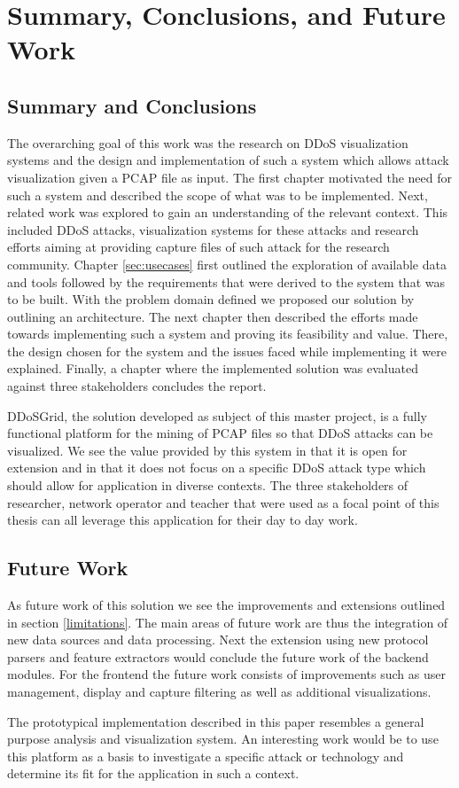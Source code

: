 \chapter{Summary, Conclusions, and Future Work} %
\section{Summary and Conclusions}
The overarching goal of this work was the research on DDoS visualization systems and the design and implementation of such a system which allows attack visualization given a PCAP file as input. The first chapter motivated the need for such a system and described the scope of what was to be implemented. Next, related work was explored to gain an understanding of the relevant context. This included DDoS attacks, visualization systems for these attacks and research efforts aiming at providing capture files of such attack for the research community.
Chapter \ref{sec:usecases} first outlined the exploration of available data and tools followed by the requirements that were derived to the system that was to be built. With the problem domain defined we proposed our solution by outlining an architecture.
The next chapter then described the efforts made towards implementing such a system and proving its feasibility and value. There, the design chosen for the system and the issues faced while implementing it were explained.
Finally, a chapter where the implemented solution was evaluated against three stakeholders concludes the report.

DDoSGrid, the solution developed as subject of this master project, is a fully functional platform for the mining of PCAP files so that DDoS attacks can be visualized. We see the value provided by this system in that it is open for extension and in that it does not focus on a specific DDoS attack type which should allow for application in diverse contexts. The three stakeholders of researcher, network operator and teacher that were used as a focal point of this thesis can all leverage this application for their day to day work.

\section{Future Work}
As future work of this solution we see the improvements and extensions outlined in section \ref{limitations}. The main areas of future work are thus the integration of new data sources and data processing. Next the extension using new protocol parsers and feature extractors would conclude the future work of the backend modules. For the frontend the future work consists of improvements such as user management, display and capture filtering as well as additional visualizations.

The prototypical implementation described in this paper resembles a general purpose analysis and visualization system. An interesting work would be to use this platform as a basis to investigate a specific attack or technology and determine its fit for the application in such a context.